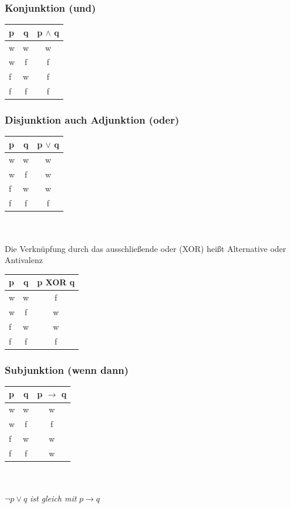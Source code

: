 \documentclass[a4paper,12pt]{scrartcl}
\begin{document}
\subsubsection{Konjunktion (und)}
\begin{tabular}{lc|c}
  p & q & p $\land$ q\\
  \hline
  w & w & w \\
  w & f & f \\
  f & w & f \\
  f & f & f \\
\end{tabular}

\subsubsection{Disjunktion auch Adjunktion (oder)}
\begin{tabular}{lc|c}
  p & q & p $\vee$ q\\
  \hline
  w & w & w \\
  w & f & w \\
  f & w & w \\
  f & f & f \\
\end{tabular}
\\ 
\\ Die Verknüpfung durch das ausschließende oder (XOR) heißt Alternative oder Antivalenz \\

\begin{tabular}{lc|c}
  p & q & p XOR q\\
  \hline
  w & w & f \\
  w & f & w \\
  f & w & w \\
  f & f & f \\
\end{tabular}

\subsubsection{Subjunktion (wenn dann)}
\begin{tabular}{lc|c}
  p & q & p $\to$ q\\
  \hline
  w & w & w \\
  w & f & f \\
  f & w & w \\
  f & f & w \\
\end{tabular}
\\
\\ $\neg p \vee q$ \textit{ist gleich mit} $p \to q$
\end{document}

